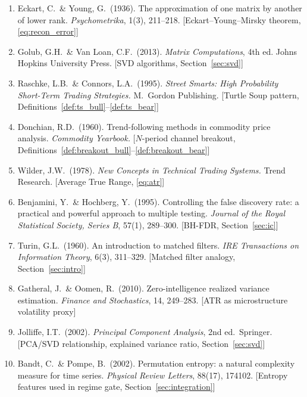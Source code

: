 \documentclass[11pt,a4paper]{article}
\theoremstyle{definition}
\theoremstyle{plain}
\begin{document}
\begin{enumerate}
    \item Eckart, C.\ \& Young, G.\ (1936). The approximation of one matrix by another of
          lower rank. \textit{Psychometrika}, 1(3), 211--218. [Eckart--Young--Mirsky
          theorem, \eqref{eq:recon_error}]

    \item Golub, G.H.\ \& Van Loan, C.F.\ (2013). \textit{Matrix Computations}, 4th ed.
          Johns Hopkins University Press. [SVD algorithms, Section~\ref{sec:svd}]

    \item Raschke, L.B.\ \& Connors, L.A.\ (1995). \textit{Street Smarts: High
          Probability Short-Term Trading Strategies.} M.\ Gordon Publishing. [Turtle Soup
          pattern, Definitions~\ref{def:ts_bull}--\ref{def:ts_bear}]

    \item Donchian, R.D.\ (1960). Trend-following methods in commodity price analysis.
          \textit{Commodity Yearbook.} [$N$-period channel breakout,
          Definitions~\ref{def:breakout_bull}--\ref{def:breakout_bear}]

    \item Wilder, J.W.\ (1978). \textit{New Concepts in Technical Trading Systems.} Trend
          Research. [Average True Range, \eqref{eq:atr}]

    \item Benjamini, Y.\ \& Hochberg, Y.\ (1995). Controlling the false discovery rate:
          a practical and powerful approach to multiple testing. \textit{Journal of the
          Royal Statistical Society, Series B}, 57(1), 289--300. [BH-FDR,
          Section~\ref{sec:ic}]

    \item Turin, G.L.\ (1960). An introduction to matched filters. \textit{IRE
          Transactions on Information Theory}, 6(3), 311--329. [Matched filter analogy,
          Section~\ref{sec:intro}]

    \item Gatheral, J.\ \& Oomen, R.\ (2010). Zero-intelligence realized variance
          estimation. \textit{Finance and Stochastics}, 14, 249--283. [ATR as
          microstructure volatility proxy]

    \item Jolliffe, I.T.\ (2002). \textit{Principal Component Analysis}, 2nd ed.\
          Springer. [PCA/SVD relationship, explained variance ratio,
          Section~\ref{sec:svd}]

    \item Bandt, C.\ \& Pompe, B.\ (2002). Permutation entropy: a natural complexity
          measure for time series. \textit{Physical Review Letters}, 88(17), 174102.
          [Entropy features used in regime gate, Section~\ref{sec:integration}]
\end{enumerate}
\end{document}
